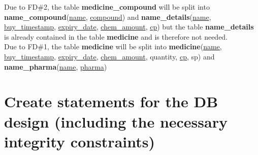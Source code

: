 \documentclass[a4papaer]{article}
\begin{document}
		Due to FD\#2, the table {\bf medicine\_compound} will be split into {\bf name\_compound}(\underline{name}, \underline{compound}) and {\bf name\_details}(\underline{name}, \underline{buy\_timestamp}, \underline{expiry\_date}, \underline{chem\_amount}, \underline{cp}) but the table {\bf name\_details} is already contained in the table {\bf medicine} and is therefore not needed.\\

		Due to FD\#1, the table {\bf medicine} will be split into {\bf medicine}(\underline{name}, \underline{buy\_timestamp}, \underline{expiry\_date}, \underline{chem\_amount}, quantity, \underline{cp}, sp) and {\bf name\_pharma}(\underline{name}, \underline{pharma})
			

\section{Create statements for the DB design (including the necessary integrity constraints)}
\end{document}

